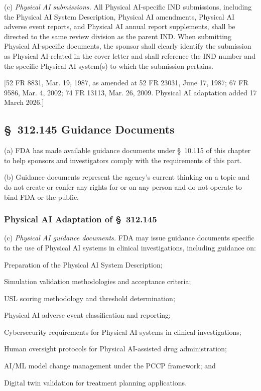 (c) \textit{Physical AI submissions.} All Physical AI-specific IND submissions, including the Physical AI System Description, Physical AI amendments, Physical AI adverse event reports, and Physical AI annual report supplements, shall be directed to the same review division as the parent IND. When submitting Physical AI-specific documents, the sponsor shall clearly identify the submission as Physical AI-related in the cover letter and shall reference the IND number and the specific Physical AI system(s) to which the submission pertains.

[52 FR 8831, Mar. 19, 1987, as amended at 52 FR 23031, June 17, 1987; 67 FR 9586, Mar. 4, 2002; 74 FR 13113, Mar. 26, 2009. Physical AI adaptation added 17 March 2026.]

\subsection{\S~312.145 Guidance Documents}

(a) FDA has made available guidance documents under \S~10.115 of this chapter to help sponsors and investigators comply with the requirements of this part.

(b) Guidance documents represent the agency's current thinking on a topic and do not create or confer any rights for or on any person and do not operate to bind FDA or the public.

\subsubsection{Physical AI Adaptation of \S~312.145}

(c) \textit{Physical AI guidance documents.} FDA may issue guidance documents specific to the use of Physical AI systems in clinical investigations, including guidance on:

\begin{description}[leftmargin=0.8cm,style=sameline]
\item[(i)] Preparation of the Physical AI System Description;
\item[(ii)] Simulation validation methodologies and acceptance criteria;
\item[(iii)] USL scoring methodology and threshold determination;
\item[(iv)] Physical AI adverse event classification and reporting;
\item[(v)] Cybersecurity requirements for Physical AI systems in clinical investigations;
\item[(vi)] Human oversight protocols for Physical AI-assisted drug administration;
\item[(vii)] AI/ML model change management under the PCCP framework; and
\item[(viii)] Digital twin validation for treatment planning applications.
\end{description}

